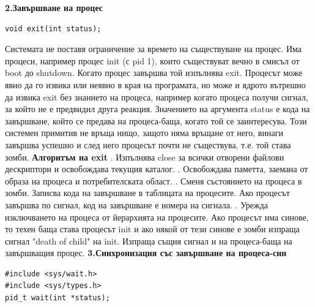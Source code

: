 \documentclass{article}
\begin{document}
\textbf{2.Завършване на процес}
\begin{lstlisting}[style=CStyle]
void exit(int status);
\end{lstlisting}
Системата не поставя ограничение за времето на съществуване на процес. Има процеси, например процес init (с pid 1), които
съществуват вечно в смисъл от boot до shutdown. Когато процес завършва той изпълнява exit. Процесът може явно да го извика или
неявно в края на програмата, но може и ядрото вътрешно да извика exit без знанието на процеса, например когато процеса получи
сигнал, за който не е предвидил друга реакция. Значението на аргумента status е кода на завършване, който се предава на
процеса-баща, когато той се заинтересува. Този системен примитив не връща нищо, защото няма връщане от него, винаги завършва
успешно и след него процесът почти не съществува, т.е. той става зомби. \newline\newline
\textbf{Алгоритъм на exit} \newline{}. Изпълнява close за всички отворени файлови дескриптори и освобождава текущия каталог. . Освобождава паметта, заемана от образа на процеса и потребителската област. . Сменя състоянието на процеса в зомби. Записва кода на завършване в таблицата на процесите. Ако процесът завършва по сигнал,
код на завършване е номера на сигнала. . Урежда изключването на процеса от йерархията на процесите. Ако процесът има синове, то техен баща става процесът init и ако
някой от тези синове е зомби изпраща сигнал "death of child" на init. Изпраща същия сигнал и на процеса-баща на завършващия процес. \newline\newline
\textbf{3.Синхронизация със завършване на процеса-син}
\begin{lstlisting}[style=CStyle]
#include <sys/wait.h>
#include <sys/types.h>
pid_t wait(int *status);
\end{lstlisting}
\end{document}
